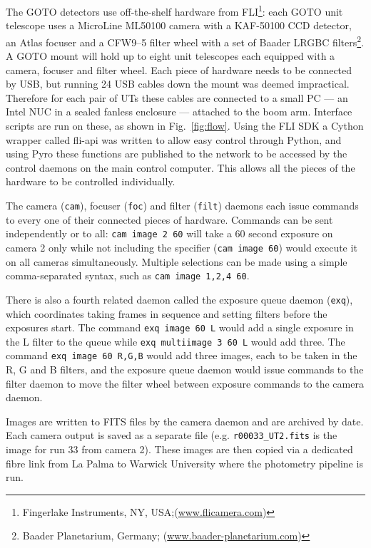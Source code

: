 \begin{colsection}
\begin{colsection}
The GOTO detectors use off-the-shelf hardware from FLI\footnote{Fingerlake Instruments, NY, USA;\@ (\url{www.flicamera.com})}: each GOTO unit telescope uses a MicroLine ML50100 camera with a KAF-50100 CCD detector, an Atlas focuser and a CFW9--5 filter wheel with a set of Baader LRGBC filters\footnote{Baader Planetarium, Germany; (\url{www.baader-planetarium.com})}. A GOTO mount will hold up to eight unit telescopes each equipped with a camera, focuser and filter wheel. Each piece of hardware needs to be connected by USB, but running 24 USB cables down the mount was deemed impractical. Therefore for each pair of UTs these cables are connected to a small PC --- an Intel NUC in a sealed fanless enclosure --- attached to the boom arm. Interface scripts are run on these, as shown in Fig.~\ref{fig:flow}. Using the FLI SDK a Cython wrapper called \textsf{fli-api} was written to allow easy control through Python, and using \textsf{Pyro} these functions are published to the network to be accessed by the control daemons on the main control computer. This allows all the pieces of the hardware to be controlled individually.

The camera (\texttt{cam}), focuser (\texttt{foc}) and filter (\texttt{filt}) daemons each issue commands to every one of their connected pieces of hardware. Commands can be sent independently or to all: \texttt{cam~image~2~60} will take a 60 second exposure on camera 2 only while not including the specifier (\texttt{cam~image~60}) would execute it on all cameras simultaneously. Multiple selections can be made using a simple comma-separated syntax, such as \texttt{cam~image~1,2,4~60}.

There is also a fourth related daemon called the exposure queue daemon (\texttt{exq}), which coordinates taking frames in sequence and setting filters before the exposures start. The command \texttt{exq~image~60~L} would add a single exposure in the L filter to the queue while \texttt{exq~multiimage~3~60~L} would add three. The command \texttt{exq~image~60~R,G,B} would add three images, each to be taken in the R, G and B filters, and the exposure queue daemon would issue commands to the filter daemon to move the filter wheel between exposure commands to the camera daemon.

Images are written to FITS files by the camera daemon and are archived by date. Each camera output is saved as a separate file (e.g. \texttt{r00033\_UT2.fits} is the image for run 33 from camera 2). These images are then copied via a dedicated fibre link from La Palma to Warwick University where the photometry pipeline is run.


\end{colsection}
\end{colsection}
